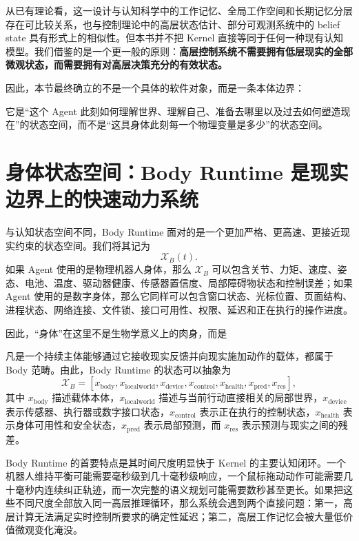 从已有理论看，这一设计与认知科学中的工作记忆、全局工作空间和长期记忆分层存在可比较关系，也与控制理论中的高层状态估计、部分可观测系统中的 belief state 具有形式上的相似性。但本书并不把 Kernel 直接等同于任何一种现有认知模型。我们借鉴的是一个更一般的原则：\textbf{高层控制系统不需要拥有低层现实的全部微观状态，而需要拥有对高层决策充分的有效状态。}

因此，本节最终确立的不是一个具体的软件对象，而是一条本体边界：
\begin{statementbox}
\centering
{}
\end{statementbox}
它是“这个 Agent 此刻如何理解世界、理解自己、准备去哪里以及过去如何塑造现在”的状态空间，而不是“这具身体此刻每一个物理变量是多少”的状态空间。

\section{身体状态空间：Body Runtime 是现实边界上的快速动力系统}

与认知状态空间不同，Body Runtime 面对的是一个更加严格、更高速、更接近现实约束的状态空间。我们将其记为
\[
\mathcal X_B(t).
\]
如果 Agent 使用的是物理机器人身体，那么 $\mathcal X_B$ 可以包含关节、力矩、速度、姿态、电池、温度、驱动器健康、传感器置信度、局部障碍物状态和控制误差；如果 Agent 使用的是数字身体，那么它同样可以包含窗口状态、光标位置、页面结构、进程状态、网络连接、文件锁、接口可用性、权限、延迟和正在执行的操作进度。

因此，“身体”在这里不是生物学意义上的肉身，而是
\begin{statementbox}
\centering
{}
\end{statementbox}
凡是一个持续主体能够通过它接收现实反馈并向现实施加动作的载体，都属于 Body 范畴。由此，Body Runtime 的状态可以抽象为
\[
\mathcal X_B
=
[
x_{\mathrm{body}},
x_{\mathrm{localworld}},
x_{\mathrm{device}},
x_{\mathrm{control}},
x_{\mathrm{health}},
x_{\mathrm{pred}},
x_{\mathrm{res}}
],
\]
其中 $x_{\mathrm{body}}$ 描述载体本体，$x_{\mathrm{localworld}}$ 描述与当前行动直接相关的局部世界，$x_{\mathrm{device}}$ 表示传感器、执行器或数字接口状态，$x_{\mathrm{control}}$ 表示正在执行的控制状态，$x_{\mathrm{health}}$ 表示身体可用性和安全状态，$x_{\mathrm{pred}}$ 表示局部预测，而 $x_{\mathrm{res}}$ 表示预测与现实之间的残差。

Body Runtime 的首要特点是其时间尺度明显快于 Kernel 的主要认知闭环。一个机器人维持平衡可能需要毫秒级到几十毫秒级响应，一个鼠标拖动动作可能需要几十毫秒内连续纠正轨迹，而一次完整的语义规划可能需要数秒甚至更长。如果把这些不同尺度全部放入同一高层推理循环，那么系统会遇到两个直接问题：第一，高层计算无法满足实时控制所要求的确定性延迟；第二，高层工作记忆会被大量低价值微观变化淹没。

